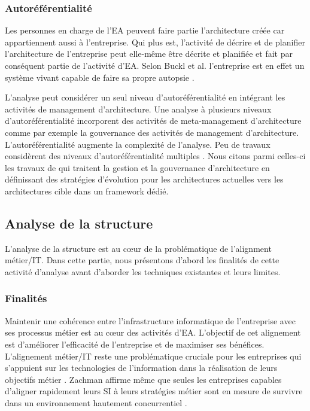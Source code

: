 \subsubsection{Autoréférentialité}

Les personnes en charge de l'EA peuvent faire partie
l'architecture créée car appartiennent aussi à l'entreprise. Qui plus est,
l'activité de décrire et de planifier l'architecture de l'entreprise peut
elle-même être décrite et planifiée et fait par conséquent partie de l'activité
d'EA. Selon Buckl et al.  \cite{varela1974autopoiesis}
l'entreprise est en effet un système vivant capable de faire sa propre autopsie
\cite{varela1974autopoiesis}.

L'analyse peut considérer un seul niveau d'autoréférentialité en intégrant les
activités de management d'architecture. Une analyse à plusieurs niveaux
d'autoréférentialité incorporent des activités de meta-management
d'architecture comme par exemple la gouvernance des activités de management
d'architecture.  L'autoréférentialité augmente la complexité de l'analyse. Peu de
travaux considèrent des niveaux d'autoréférentialité multiples
\cite{smook2014executable}. Nous citons parmi celles-ci les travaux de
\cite{metrailler_evolis_2014} qui traitent la gestion et la gouvernance
d'architecture en définissant des stratégies d'évolution pour les architectures
actuelles vers les architectures cible dans un framework dédié. 


\subsection{Analyse de la structure}

L'analyse de la structure est au cœur de la problématique de l'alignment 
métier/IT. Dans cette partie, nous présentons d'abord les finalités de
cette activité d'analyse avant d'aborder les techniques existantes et
leurs limites.


\subsubsection{Finalités}

Maintenir une cohérence entre l'infrastructure informatique de l'entreprise
avec ses processus métier est au cœur des activités
d'EA\cite{lankhorst2013enterprise}. L'objectif de cet alignement est
d'améliorer l'efficacité de l'entreprise et de maximiser ses bénéfices.
L'alignement métier/IT reste une problématique cruciale pour les entreprises
qui s'appuient sur les technologies de l'information dans la réalisation de leurs
objectifs métier \cite{kaisler_enterprise_2005}. Zachman affirme même que
seules les entreprises capables d'aligner rapidement leurs SI à leurs
stratégies métier sont en mesure de survivre dans un environnement hautement
concurrentiel \cite{zachman1997enterprise}.
	
